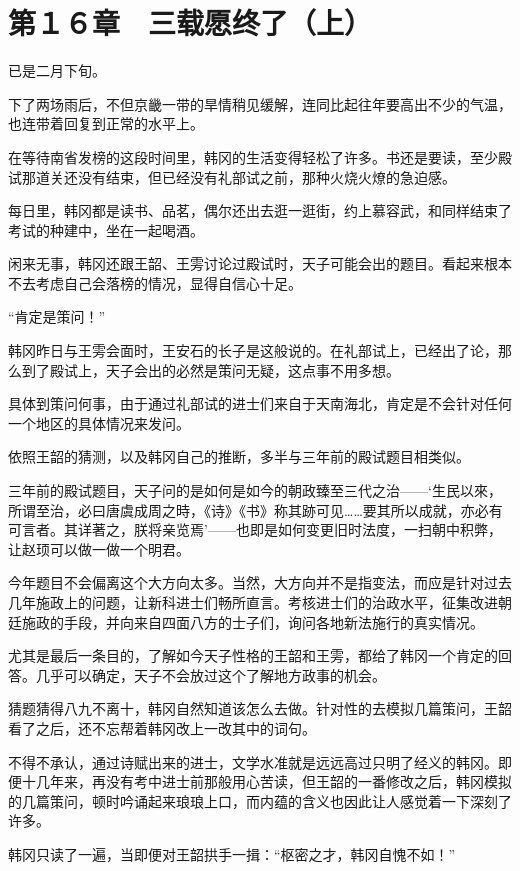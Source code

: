 \section{第１６章　三载愿终了（上）}

已是二月下旬。

下了两场雨后，不但京畿一带的旱情稍见缓解，连同比起往年要高出不少的气温，也连带着回复到正常的水平上。

在等待南省发榜的这段时间里，韩冈的生活变得轻松了许多。书还是要读，至少殿试那道关还没有结束，但已经没有礼部试之前，那种火烧火燎的急迫感。

每日里，韩冈都是读书、品茗，偶尔还出去逛一逛街，约上慕容武，和同样结束了考试的种建中，坐在一起喝酒。

闲来无事，韩冈还跟王韶、王雱讨论过殿试时，天子可能会出的题目。看起来根本不去考虑自己会落榜的情况，显得自信心十足。

“肯定是策问！”

韩冈昨日与王雱会面时，王安石的长子是这般说的。在礼部试上，已经出了论，那么到了殿试上，天子会出的必然是策问无疑，这点事不用多想。

具体到策问何事，由于通过礼部试的进士们来自于天南海北，肯定是不会针对任何一个地区的具体情况来发问。

依照王韶的猜测，以及韩冈自己的推断，多半与三年前的殿试题目相类似。

三年前的殿试题目，天子问的是如何是如今的朝政臻至三代之治——‘生民以來，所谓至治，必曰唐虞成周之時，《诗》《书》称其跡可见……要其所以成就，亦必有可言者。其详著之，朕将亲览焉’——也即是如何变更旧时法度，一扫朝中积弊，让赵顼可以做一做一个明君。

今年题目不会偏离这个大方向太多。当然，大方向并不是指变法，而应是针对过去几年施政上的问题，让新科进士们畅所直言。考核进士们的治政水平，征集改进朝廷施政的手段，并向来自四面八方的士子们，询问各地新法施行的真实情况。

尤其是最后一条目的，了解如今天子性格的王韶和王雱，都给了韩冈一个肯定的回答。几乎可以确定，天子不会放过这个了解地方政事的机会。

猜题猜得八九不离十，韩冈自然知道该怎么去做。针对性的去模拟几篇策问，王韶看了之后，还不忘帮着韩冈改上一改其中的词句。

不得不承认，通过诗赋出来的进士，文学水准就是远远高过只明了经义的韩冈。即便十几年来，再没有考中进士前那般用心苦读，但王韶的一番修改之后，韩冈模拟的几篇策问，顿时吟诵起来琅琅上口，而内蕴的含义也因此让人感觉着一下深刻了许多。

韩冈只读了一遍，当即便对王韶拱手一揖：“枢密之才，韩冈自愧不如！”

